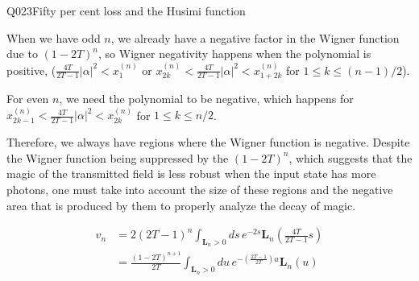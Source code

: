 \begin{entry}{Q023}{Fifty per cent loss and the Husimi function}
\begin{solution}[Part (c)]
 When we have odd $n$, we already have a negative factor in the Wigner function due to $(1-2T)^n$, so Wigner negativity happens when the polynomial is positive, ($\frac{4T}{2T-1} |\alpha|^2 < x^{(n)}_1$ or $x^{(n)}_{2k}<\frac{4T}{2T-1} |\alpha|^2<x^{(n)}_{1+2k}$ for $1\leq k \leq (n-1)/2$).

 For even $n$, we need the polynomial to be negative, which happens for $x^{(n)}_{2k-1}<\frac{4T}{2T-1} |\alpha|^2<x^{(n)}_{2k}$ for $1\leq k \leq n/2$.

 Therefore, we always have regions where the Wigner function is negative. Despite the Wigner function being suppressed by the $(1-2T)^n$, which suggests that the magic of the transmitted field is less robust when the input state has more photons, one must take into account the size of these regions and the negative area that is produced by them to properly analyze the decay of magic.    
\end{solution}


\begin{takeaway}
\begin{equation}
\begin{split}
    v_n &= 2(2T-1)^n\int_{\mathbf{L}_n>0} ds\, e^{-2 s}\mathbf{L}_n\left(\frac{4T}{2T-1} s\right)\\
    &=\frac{(1-2T)^{n+1}}{2T} \int_{\mathbf{L}_n>0} du\, e^{- \left(\frac{2T-1}{2T}\right) u} \mathbf{L}_n\left( u \right)\\
\end{split}
\end{equation}
\end{takeaway}


\end{entry}
